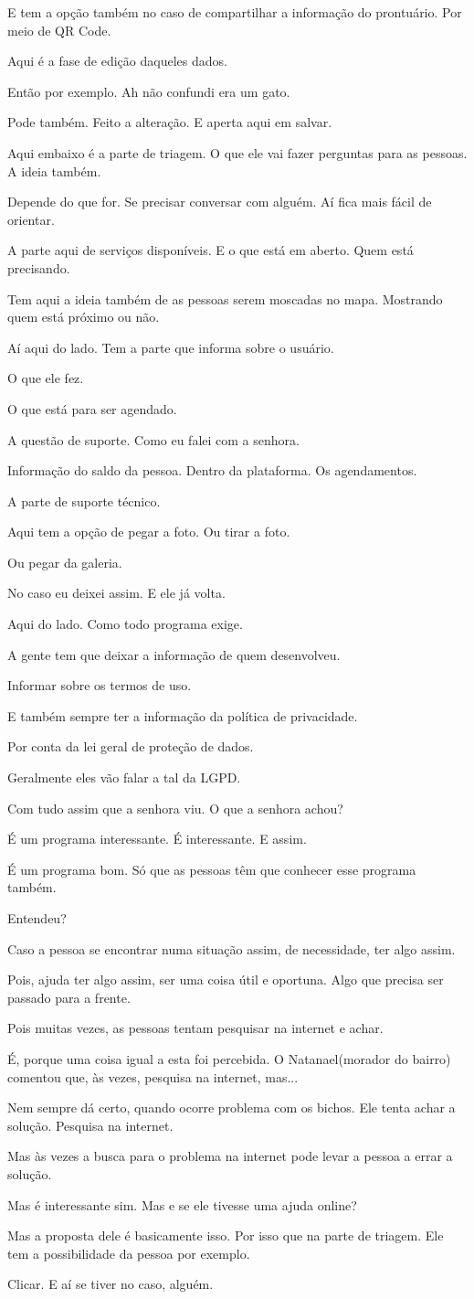 \documentclass[12pt,a4paper]{article}
\newenvironment{turnos}{\begin{list}{}{\setlength{\leftmargin}{2.2cm}\setlength{\labelwidth}{2.0cm}\setlength{\labelsep}{0.2cm}\setlength{\itemsep}{0.45em}\setlength{\parsep}{0pt}}}{\end{list}}
\newcommand{\fala}[1]{\item[\textbf{#1}\hfill]}
\begin{document}
\begin{turnos}
\fala{E:} E tem a opção também no caso de compartilhar a informação do prontuário. Por meio de QR Code.
\fala{E:} Aqui é a fase de edição daqueles dados. 
\fala{E:} Então por exemplo. Ah não confundi era um gato.
\fala{E:} Pode também. Feito a alteração. E aperta aqui em salvar.
\fala{E:} Aqui embaixo é a parte de triagem. O que ele vai fazer perguntas para as pessoas. A ideia também.
\fala{E:} Depende do que for. Se precisar conversar com alguém. Aí fica mais fácil de orientar.
\fala{E:} A parte aqui de serviços disponíveis. E o que está em aberto. Quem está precisando.
\fala{E:} Tem aqui a ideia também de as pessoas serem moscadas no mapa. Mostrando quem está próximo ou não.
\fala{E:} Aí aqui do lado. Tem a parte que informa sobre o usuário. 
\fala{E:} O que ele fez.
\fala{E:} O que está para ser agendado. 
\fala{E:} A questão de suporte. Como eu falei com a senhora.
\fala{E:} Informação do saldo da pessoa. Dentro da plataforma. Os agendamentos.
\fala{E:} A parte de suporte técnico. 
\fala{E:} Aqui tem a opção de pegar a foto. Ou tirar a foto.
\fala{G:} Ou pegar da galeria. 
\fala{E:} No caso eu deixei assim. E ele já volta.
\fala{E:} Aqui do lado. Como todo programa exige. 
\fala{E:} A gente tem que deixar a informação de quem desenvolveu.
\fala{E:} Informar sobre os termos de uso. 
\fala{E:} E também sempre ter a informação da política de privacidade. 
\fala{E:} Por conta da lei geral de proteção de dados.
\fala{E:} Geralmente eles vão falar a tal da LGPD. 
\fala{E:} Com tudo assim que a senhora viu. O que a senhora achou?
\fala{G:} É um programa interessante. É interessante. E assim.
\fala{G:} É um programa bom. Só que as pessoas têm que conhecer esse programa também.
\fala{G:} Entendeu?
\fala{A:} Caso a pessoa se encontrar numa situação assim, de necessidade, ter algo assim.
\fala{G:} Pois, ajuda ter algo assim, ser uma coisa útil e oportuna. Algo que precisa ser passado para a frente.
\fala{A:} Pois muitas vezes, as pessoas tentam pesquisar na internet e achar.
\fala{E:} É, porque uma coisa igual a esta foi percebida. O Natanael(morador do bairro) comentou que, às vezes, pesquisa na internet, mas...
\fala{E:} Nem sempre dá certo, quando ocorre problema com os bichos. Ele tenta achar a solução. Pesquisa na internet.
\fala{E:} Mas às vezes a busca para o problema na internet pode levar a pessoa a errar a solução.
\fala{G:} Mas é interessante sim. Mas e se ele tivesse uma ajuda online?
\fala{E:} Mas a proposta dele é basicamente isso. Por isso que na parte de triagem. Ele tem a possibilidade da pessoa por exemplo.
\fala{E:} Clicar. E aí se tiver no caso, alguém.

\end{turnos}
\end{document}
